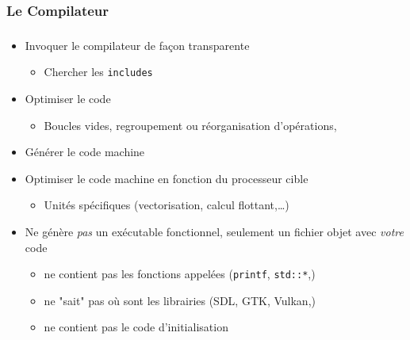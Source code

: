 \subsubsection{Le Compilateur}
\begin{frame}
\frametitle{\insertsubsubsection}
\begin{itemize}
  \item Invoquer le compilateur de façon transparente
    \begin{itemize}
      \item Chercher les \texttt{includes}
    \end{itemize}
  \item Optimiser le code
    \begin{itemize}
      \item Boucles vides, regroupement ou réorganisation d'opérations,\…
    \end{itemize}
  \item Générer le code machine
  \item Optimiser le code machine en fonction du processeur cible
    \begin{itemize}
      \item Unités spécifiques (vectorisation, calcul flottant,…)
    \end{itemize}
  \item Ne génère \textit{pas} un exécutable fonctionnel, seulement un fichier objet avec \textit{votre} code
    \begin{itemize}
      \item ne contient pas les fonctions appelées (\texttt{printf}, \texttt{std::*},)
      \item ne "sait" pas où sont les librairies (SDL, GTK, Vulkan,\…)
      \item ne contient pas le code d'initialisation
    \end{itemize}
\end{itemize}

\end{frame}

